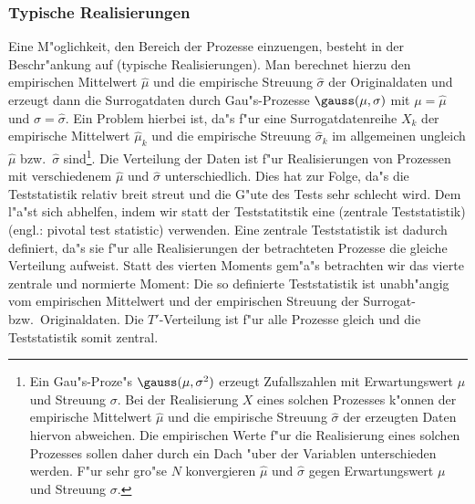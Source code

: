 \subsubsection{Typische Realisierungen}
Eine M"oglichkeit, den Bereich der Prozesse einzuengen, besteht in der Beschr"ankung auf
\begriff(typische Realisierungen). Man berechnet hierzu den empirischen Mittelwert
$\hat\mu$ und die empirische Streuung $\hat\sigma$ der Originaldaten
und erzeugt dann die Surrogatdaten durch Gau"s-Prozesse $\gauss(\mu,\sigma)$ mit
$\mu=\hat\mu$ und $\sigma=\hat\sigma$. Ein Problem hierbei ist, da"s f"ur eine
Surrogatdatenreihe $X_k$ der empirische Mittelwert $\hat\mu_k$ und die empirische Streuung
$\hat\sigma_k$ im allgemeinen ungleich
$\hat\mu$ bzw.\ $\hat\sigma$ sind\footnote{Ein Gau"s-Proze"s $\gauss(\mu,\sigma^2)$ erzeugt Zufallszahlen
  mit Erwartungswert $\mu$ und Streuung $\sigma$. Bei der Realisierung $X$ eines
  solchen Prozesses k"onnen der empirische Mittelwert $\hat\mu$ und die empirische
  Streuung $\hat\sigma$ der erzeugten Daten hiervon abweichen.  Die empirischen Werte f"ur
  die Realisierung eines solchen Prozesses sollen daher durch ein Dach "uber der Variablen
  unterschieden werden. F"ur sehr gro"se $N$ konvergieren $\hat\mu$ und $\hat\sigma$ gegen
  Erwartungswert $\mu$ und Streuung $\sigma$.}.
Die Verteilung der Daten ist f"ur Realisierungen von 
Prozessen mit verschiedenem $\hat\mu$ und $\hat\sigma$ unterschiedlich. Dies hat zur Folge, da"s die Teststatistik relativ
breit streut und die G"ute des Tests sehr schlecht wird. Dem l"a"st sich
abhelfen, indem wir statt der Teststatitstik  eine
\begriff(zentrale Teststatistik) (engl.: pivotal test statistic) verwenden. Eine zentrale
Teststatistik ist dadurch definiert, da"s sie f"ur
alle Realisierungen der betrachteten Prozesse die gleiche Verteilung aufweist. 
Statt des vierten Moments gem"a"s  betrachten wir das vierte zentrale
und normierte Moment:
Die so definierte Teststatistik ist unabh"angig vom empirischen Mittelwert und der empirischen
Streuung der Surrogat- bzw.\ Originaldaten. Die $T'$-Verteilung ist f"ur alle
Prozesse gleich und die Teststatistik somit zentral.





